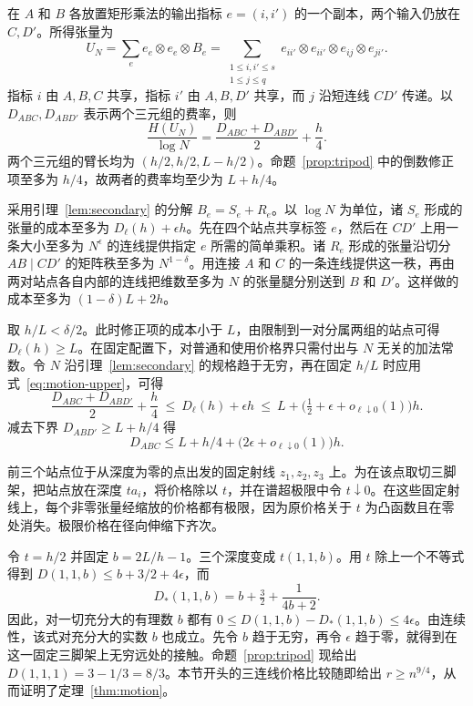 在 \(A\) 和 \(B\) 各放置矩形乘法的输出指标 \(e=(i,i')\) 的一个副本，两个输入仍放在 \(C,D'\)。所得张量为
\[
 U_N=\sum_e e_e\otimes e_e\otimes B_e
     =\sum_{\substack{1\le i,i'\le s\\1\le j\le q}}
        e_{ii'}\otimes e_{ii'}\otimes e_{ij}\otimes e_{ji'} .
\]
指标 \(i\) 由 \(A,B,C\) 共享，指标 \(i'\) 由 \(A,B,D'\) 共享，而 \(j\) 沿短连线 \(CD'\) 传递。以 \(D_{ABC},D_{ABD'}\) 表示两个三元组的费率，则
\[
   \frac{H(U_N)}{\log N}=\frac{D_{ABC}+D_{ABD'}}2+\frac h4 .
\]
两个三元组的臂长均为 \((h/2,h/2,L-h/2)\)。命题~\ref{prop:tripod} 中的倒数修正项至多为 \(h/4\)，故两者的费率均至少为 \(L+h/4\)。

采用引理~\ref{lem:secondary} 的分解 \(B_e=S_e+R_e\)。以 \(\log N\) 为单位，诸 \(S_e\) 形成的张量的成本至多为 \(D_\ell(h)+\epsilon h\)。先在四个站点共享标签 \(e\)，然后在 \(CD'\) 上用一条大小至多为 \(N^\epsilon\) 的连线提供指定 \(e\) 所需的简单乘积。诸 \(R_e\) 形成的张量沿切分 \(AB\mid CD'\) 的矩阵秩至多为 \(N^{1-\delta}\)。用连接 \(A\) 和 \(C\) 的一条连线提供这一秩，再由两对站点各自内部的连线把维数至多为 \(N\) 的张量腿分别送到 \(B\) 和 \(D'\)。这样做的成本至多为 \((1-\delta)L+2h\)。

取 \(h/L<\delta/2\)。此时修正项的成本小于 \(L\)，由限制到一对分属两组的站点可得 \(D_\ell(h)\ge L\)。在固定配置下，对普通和使用价格界只需付出与 \(N\) 无关的加法常数。令 \(N\) 沿引理~\ref{lem:secondary} 的规格趋于无穷，再在固定 \(h/L\) 时应用式~\eqref{eq:motion-upper}，可得
\[
  \frac{D_{ABC}+D_{ABD'}}2+\frac h4
  \ \le\ D_\ell(h)+\epsilon h
  \ \le\ L+\bigl(\tfrac12+\epsilon+o_{\ell\downarrow0}(1)\bigr)h .
\]
减去下界 \(D_{ABD'}\ge L+h/4\) 得
\[
        D_{ABC}\le L+h/4+\bigl(2\epsilon+o_{\ell\downarrow0}(1)\bigr)h.
\]

前三个站点位于从深度为零的点出发的固定射线 \(z_1,z_2,z_3\) 上。为在该点取切三脚架，把站点放在深度 \(t a_i\)，将价格除以 \(t\)，并在谱超极限中令 \(t\downarrow0\)。在这些固定射线上，每个非零张量经缩放的价格都有极限，因为原价格关于 \(t\) 为凸函数且在零处消失。极限价格在径向伸缩下齐次。

令 \(t=h/2\) 并固定 \(b=2L/h-1\)。三个深度变成 \(t(1,1,b)\)。用 \(t\) 除上一个不等式得到 \(D(1,1,b)\le b+3/2+4\epsilon\)，而
\[
             D_*(1,1,b)=b+\tfrac32+\frac{1}{4b+2}.
\]
因此，对一切充分大的有理数 \(b\) 都有 \(0\le D(1,1,b)-D_*(1,1,b)\le4\epsilon\)。由连续性，该式对充分大的实数 \(b\) 也成立。先令 \(b\) 趋于无穷，再令 \(\epsilon\) 趋于零，就得到在这一固定三脚架上无穷远处的接触。命题~\ref{prop:tripod} 现给出 \(D(1,1,1)=3-1/3=8/3\)。本节开头的三连线价格比较随即给出 \(r\ge n^{9/4}\)，从而证明了定理~\ref{thm:motion}。
